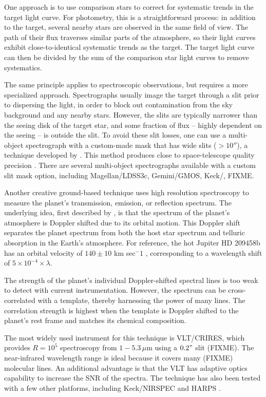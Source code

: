\documentclass[graybox,natbib,nosecnum]{svmult}
\begin{document}
One approach is to use comparison stars to correct for systematic trends in the target light curve. For photometry, this is a straightforward process: in addition to the target, several nearby stars are observed in the same field of view. The path of their flux traverses similar parts of the atmosphere, so their light curves exhibit close-to-identical systematic trends as the target. The target light curve can then be divided by the sum of the comparison star light curves to remove systematics. 

The same principle applies to spectroscopic observations, but requires a more specialized approach.  Spectrographs usually image the target through a slit prior to dispersing the light, in order to block out contamination from the sky background and any nearby stars. However, the slits are typically narrower than the seeing disk of the target star, and some fraction of flux -- highly dependent on the seeing -- is outside the slit.  To avoid these slit losses, one can use a multi-object spectrograph with a custom-made mask that has wide slits ($>10''$), a technique developed by \cite{bean10}. This method produces close to space-telescope quality precision \citep[e.g.][]{}.  There are several multi-object spectrographs available with a custom slit mask option, including Magellan/LDSS3c, Gemini/GMOS, Keck/, FIXME.  

Another creative ground-based technique uses high resolution spectroscopy to measure the planet's transmission, emission, or reflection spectrum.  The underlying idea, first described by \citep{FIXME}, is that the spectrum of the planet's atmosphere is Doppler shifted due to its orbital motion. This Doppler shift separates the planet spectrum from both the host star spectrum and telluric absorption in the Earth's atmosphere. For reference, the hot Jupiter HD 209458b has an orbital velocity of $140\pm10$ km sec$^-1$ \citep{snellen10}, corresponding to a wavelength shift of $5\times10^{-4}\times \lambda$.  

The strength of the planet's individual Doppler-shifted spectral lines is too weak to detect with current instrumentation. However, the spectrum can be cross-correlated with a template, thereby harnessing the power of many lines.  The correlation strength is highest when the template is Doppler shifted to the planet's rest frame and matches its chemical composition.

The most widely used instrument for this technique is VLT/CRIRES, which provides $R=10^5$ spectroscopy from $1-5.3\,\mu$m using a $0.2"$ slit (FIXME).  The near-infrared wavelength range is ideal because it covers many (FIXME) molecular lines. An additional advantage is that the VLT has adaptive optics capability to increase the SNR of the spectra.  The technique has also been tested with a few other platforms, including Keck/NIRSPEC and HARPS \citep{lockwood14, martins15}. 
\end{document}
